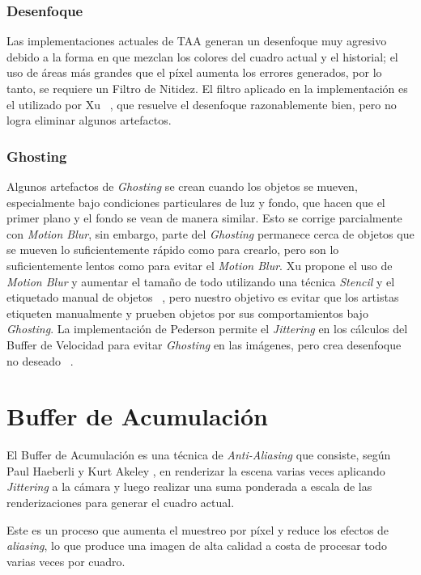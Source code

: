 \documentclass[pregrado]{tesis-usb} %
\begin{document}
\subsubsection{Desenfoque} 
Las implementaciones actuales de TAA generan un desenfoque muy agresivo debido a la forma en que mezclan los colores del cuadro actual y el historial; el uso de áreas más grandes que el píxel aumenta los errores generados, por lo tanto, se requiere un Filtro de Nitidez. El filtro aplicado en la implementación es el utilizado por Xu ~\cite{XU2016}, que resuelve el desenfoque razonablemente bien, pero no logra eliminar algunos artefactos. 

\subsubsection{Ghosting} 
Algunos artefactos de \textit{Ghosting} se crean cuando los objetos se mueven, especialmente bajo condiciones particulares de luz y fondo, que hacen que el primer plano y el fondo se vean de manera similar. Esto se corrige parcialmente con \textit{Motion Blur}, sin embargo, parte del \textit{Ghosting} permanece cerca de objetos que se mueven lo suficientemente rápido como para crearlo, pero son lo suficientemente lentos como para evitar el \textit{Motion Blur}. Xu propone el uso de \textit{Motion Blur} y aumentar el tamaño de todo utilizando una técnica \textit{Stencil} y el etiquetado manual de objetos ~\cite{XU2016}, pero nuestro objetivo es evitar que los artistas etiqueten manualmente y prueben objetos por sus comportamientos bajo \textit{Ghosting}. La implementación de Pederson permite el \textit{Jittering} en los cálculos del Buffer de Velocidad para evitar \textit{Ghosting} en las imágenes, pero crea desenfoque no deseado ~\cite{Fuglsand2016}. 

\section{Buffer de Acumulación}
El Buffer de Acumulación es una técnica de \textit{Anti-Aliasing} que consiste, según Paul Haeberli y Kurt Akeley \cite{Haeberli1990}, en renderizar la escena varias veces aplicando \textit{Jittering} a la cámara y luego realizar una suma ponderada a escala de las renderizaciones para generar el cuadro actual.

Este es un proceso que aumenta el muestreo por píxel y reduce los efectos de \textit{aliasing}, lo que produce una imagen de alta calidad a costa de procesar todo varias veces por cuadro.
\end{document}
